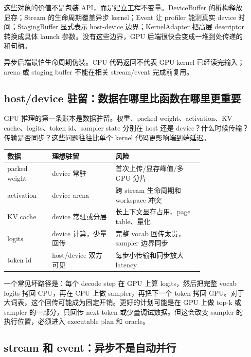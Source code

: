 这些对象的价值不是包装 API，而是建立工程不变量。DeviceBuffer 的析构释放显存；Stream 的生命周期覆盖异步 kernel；Event 让 profiler 能测真实 device 时间；StagingBuffer 显式表示 host-device 边界；KernelAdapter 把高层 descriptor 转换成具体 launch 参数。没有这些边界，GPU 后端很快会变成一堆到处传递的  和句柄。

\begin{warningbox}
异步后端最怕生命周期伪装。CPU 代码返回不代表 GPU kernel 已经读完输入；arena 或 staging buffer 不能在相关 stream/event 完成前复用。
\end{warningbox}

\subsection{host/device 驻留：数据在哪里比函数在哪里更重要}

GPU 推理的第一条账本是数据驻留。权重、packed weight、activation、KV cache、logits、token id、sampler state 分别在 host 还是 device？什么时候传输？传输是否同步？这些问题往往比单个 kernel 代码更影响端到端延迟。

\begin{center}
\begin{tabular}{p{0.18\linewidth}p{0.26\linewidth}p{0.36\linewidth}}
\toprule
数据 & 理想驻留 & 风险 \\
\midrule
packed weight & device 常驻 & 首次上传/显存峰值/多 GPU 分片 \\
activation & device arena & 跨 stream 生命周期和 workspace 冲突 \\
KV cache & device 常驻或分层 & 长上下文显存占用、page table、量化 \\
logits & device 计算，少量回传 & 完整 vocab 回传太贵，sampler 边界同步 \\
token id & host/device 双方可见 & 每步小传输和同步放大 latency \\
\bottomrule
\end{tabular}
\end{center}

一个常见坏路径是：每个 decode step 在 GPU 上算 logits，然后把完整 vocab logits 拷回 CPU，再在 CPU 上做 sampler，再把下一个 token 拷回 GPU。对于大词表，这个回传可能成为固定开销。更好的计划可能是在 GPU 上做 top-k 或 sampler 的一部分，只回传 next token 或少量调试数据。但这会改变 sampler 的执行位置，必须进入 executable plan 和 oracle。

\subsection{stream 和 event：异步不是自动并行}

